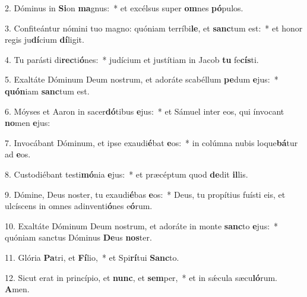2. Dóminus in \textbf{Si}on \textbf{ma}gnus:~*  et excélsus super \textbf{om}nes \textbf{pó}pulos.\

3. Confiteántur nómini tuo magno: quóniam terríbi\textbf{le}, et \textbf{sanc}tum est:~*  et honor regis ju\textbf{dí}cium \textbf{dí}ligit.\

4. Tu parásti di\textbf{rec}ti\textbf{ó}nes:~*  judícium et justítiam in Jacob \textbf{tu} fe\textbf{cís}ti.\

5. Exaltáte Dóminum Deum nostrum, et adoráte scabéllum \textbf{pe}dum \textbf{e}jus:~*  \textbf{quón}iam \textbf{sanc}tum est.\

6. Móyses et Aaron in sacer\textbf{dó}tibus \textbf{e}jus:~*  et Sámuel inter eos, qui ínvocant \textbf{no}men \textbf{e}jus:\

7. Invocábant Dóminum, et ipse exaudi\textbf{é}bat \textbf{e}os:~*  in colúmna nubis loque\textbf{bá}tur ad \textbf{e}os.\

8. Custodiébant testi\textbf{mó}nia \textbf{e}jus:~*  et præcéptum quod \textbf{de}dit \textbf{il}lis.\

9. Dómine, Deus noster, tu exaudi\textbf{é}bas \textbf{e}os:~*  Deus, tu propítius fuísti eis, et ulcíscens in omnes adinventi\textbf{ó}nes e\textbf{ó}rum.\

10. Exaltáte Dóminum Deum nostrum, et adoráte in monte \textbf{sanc}to \textbf{e}jus:~*  quóniam sanctus Dóminus \textbf{De}us \textbf{nos}ter.\

11. Glória \textbf{Pa}tri, et \textbf{Fí}lio,~*  et Spi\textbf{rí}tui \textbf{Sanc}to.\

12. Sicut erat in princípio, et \textbf{nunc}, et \textbf{sem}per,~*  et in sǽcula sæcu\textbf{ló}rum. \textbf{A}men.\

